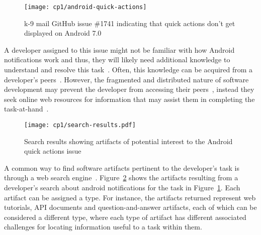  \medskip
 \begin{figure}[h!]
     \centering
     \texttt{[image: cp1/android-quick-actions]}
     \caption{k-9 mail GitHub issue \#1741 indicating that quick actions don't get displayed on Android 7.0}
     \label{fig:android-notifications-task}
 \end{figure}
 
 
 \medskip
 A developer assigned to this issue might not be familiar with how Android notifications work and thus, they will likely need additional knowledge to understand and resolve this task~\cite{ko2007, Li2013, sillito2006}. 
 Often, this knowledge can be acquired from a developer's peers~\cite{singer2011}. 
 However, the fragmented and distributed nature of software development  
 may prevent the developer from accessing their peers~\cite{ko2007},
 instead they seek online web resources for information 
 that may assist them in completing the task-at-hand~\cite{Xia2017, rao2020}.
 
 
 
 
 
 \begin{figure}
     \centering
     \texttt{[image: cp1/search-results.pdf]}
     \caption{Search results showing artifacts of potential interest to the Android quick actions issue}
     \label{fig:android-search-results}
 \end{figure}
 
 
 
A common way to find software artifacts
pertinent to the developer's task
is through a web search engine~\cite{Brandt2009a, Li2013}.
Figure~\ref{fig:android-search-results}
shows the artifacts resulting from a developer's search 
about android notifications for the task in Figure~\ref{fig:android-notifications-task}.
Each artifact can be assigned a type. For instance,
the artifacts returned represent web tutorials, API documents and question-and-answer
artifacts, each of which can be considered a different type,
where each type of artifact has different associated challenges for locating 
information useful to a task within them.






